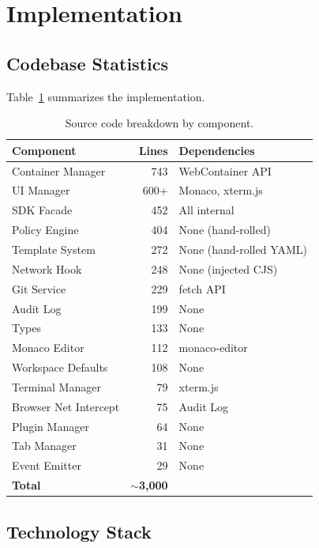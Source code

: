 \documentclass[11pt,twocolumn]{article}
\begin{document}
\section{Implementation}
\label{sec:implementation}

\subsection{Codebase Statistics}

Table~\ref{tab:loc} summarizes the implementation.

\begin{table}[H]
\centering
\caption{Source code breakdown by component.}
\label{tab:loc}
\scriptsize
\begin{tabular}{@{}lrl@{}}
\toprule
\textbf{Component} & \textbf{Lines} & \textbf{Dependencies} \\
\midrule
Container Manager & 743 & WebContainer API \\
UI Manager & 600+ & Monaco, xterm.js \\
SDK Facade & 452 & All internal \\
Policy Engine & 404 & None (hand-rolled) \\
Template System & 272 & None (hand-rolled YAML) \\
Network Hook & 248 & None (injected CJS) \\
Git Service & 229 & fetch API \\
Audit Log & 199 & None \\
Types & 133 & None \\
Monaco Editor & 112 & monaco-editor \\
Workspace Defaults & 108 & None \\
Terminal Manager & 79 & xterm.js \\
Browser Net Intercept & 75 & Audit Log \\
Plugin Manager & 64 & None \\
Tab Manager & 31 & None \\
Event Emitter & 29 & None \\
\midrule
\textbf{Total} & $\sim$\textbf{3,000} & \\
\bottomrule
\end{tabular}
\end{table}

\subsection{Technology Stack}
\end{document}
